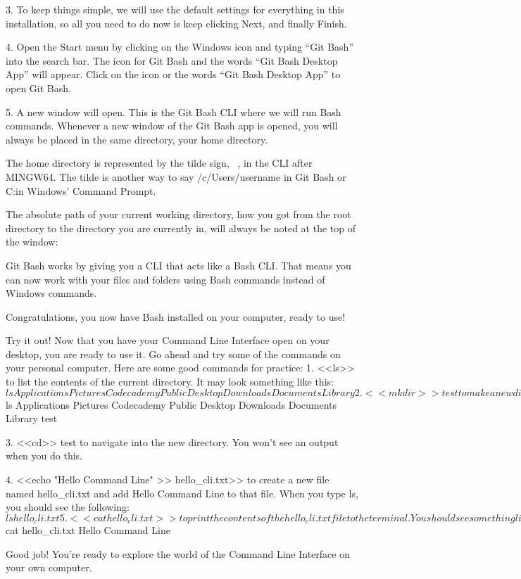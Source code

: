         3. To keep things simple, we will use the default settings for everything in this installation, so all you need to do now is keep clicking Next, and finally Finish.
        
        4. Open the Start menu by clicking on the Windows icon and typing “Git Bash” into the search bar. The icon for Git Bash and the words “Git Bash Desktop App” will appear. Click on the icon or the words “Git Bash Desktop App” to open Git Bash.
        
        5. A new window will open. This is the Git Bash CLI where we will run Bash commands. Whenever a new window of the Git Bash app is opened, you will always be placed in the same directory, your home directory.

        The home directory is represented by the tilde sign, ~, in the CLI after MINGW64. The tilde is another way to say /c/Users/username in Git Bash or C:\home\Users\username in Windows’ Command Prompt.

        The absolute path of your current working directory, how you got from the root directory to the directory you are currently in, will always be noted at the top of the window:

        Git Bash works by giving you a CLI that acts like a Bash CLI. That means you can now work with your files and folders using Bash commands instead of Windows commands.

        Congratulations, you now have Bash installed on your computer, ready to use!

    Try it out!
        Now that you have your Command Line Interface open on your desktop, you are ready to use it. Go ahead and try some of the commands on your personal computer. Here are some good commands for practice:
            1. <<ls>> to list the contents of the current directory. It may look something like this:
                $ ls
                Applications                Pictures
                Codecademy                  Public
                Desktop                     Downloads
                Documents                   Library
            2. <<mkdir>> test to make a new directory named test. Now, when you type ls you should see a folder called test:
                $ ls
                Applications                Pictures
                Codecademy                  Public
                Desktop                     Downloads
                Documents                   Library
                test

            3. <<cd>> test to navigate into the new directory. You won’t see an output when you do this.
        
            4. <<echo "Hello Command Line" >> hello_cli.txt>> to create a new file named hello_cli.txt and add Hello Command Line to that file. When you type ls, you should see the following:
                $ ls
                hello_cli.txt
        
            5. <<cat hello_cli.txt>> to print the contents of the hello_cli.txt file to the terminal. You should see something like:
                $ cat hello_cli.txt
                Hello Command Line
                
        Good job! You’re ready to explore the world of the Command Line Interface on your own computer.